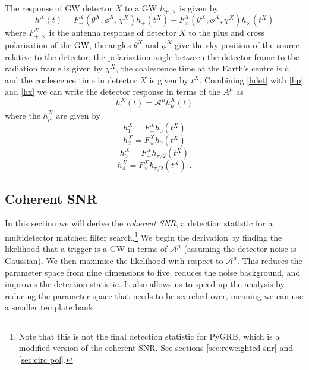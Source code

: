 \documentclass[11pt]{cuthesis}
\begin{document}
The response of GW detector $X$ to a GW $h_{+,\times}$ is given by
\begin{equation} \label{hdet}
h^X(t) = F^X_+(\theta^X,\phi^X,\chi^X) h_+(t^X) + F^X_\times(\theta^X,\phi^X,\chi^X) h_\times (t^X)
\end{equation}
where $F_{+,\times}^X$ is the antenna response of detector $X$ to the plus and cross polarisation of the GW, the angles $\theta^X$ and $\phi^X$ give the sky position of the source relative to the detector, the polarisation angle between the detector frame to the radiation frame is given by $\chi^X$, the coalescence time at the Earth's centre is $t$, and the coalescence time in detector $X$ is given by $t^X$. Combining \ref{hdet} with \ref{hp} and \ref{hx} we can write the detector response in terms of the $A^\mu$ as
\begin{equation} \label{h in A}
h^X(t) = \mathcal{A}^\mu h_\mu^X(t) 
\end{equation}
where the $h_\mu^X$ are given by
\begin{equation}
h_1^X = F_+^X h_0(t^X) 
\end{equation}
\begin{equation}
h_2^X = F_\times^X h_0(t^X) 
\end{equation}
\begin{equation}
h_3^X = F_+^X h_{\pi/2}(t^X) 
\end{equation}
\begin{equation}
h_4^X = F_\times^X h_{\pi/2}(t^X) \textbf{ .} 
\end{equation}

\subsection{Coherent SNR} \label{sec:coh snr}
In this section we will derive the \textit{coherent SNR}, a detection statistic for a multidetector matched filter search.\footnote{Note that this is not the final detection statistic for PyGRB, which is a modified version of the coherent SNR. See sections \ref{sec:reweighted snr} and \ref{sec:circ pol}.} We begin the derivation by finding the likelihood that a trigger is a GW in terms of $\mathcal{A}^\mu$ (assuming the detector noise is Gaussian). We then maximise the likelihood with respect to $\mathcal{A}^\mu$. This reduces the parameter space from nine dimensions to five, reduces the noise background, and improves the detection statistic. It also allows us to speed up the analysis by reducing the parameter space that needs to be searched over, meaning we can use a smaller template bank.
\end{document}
